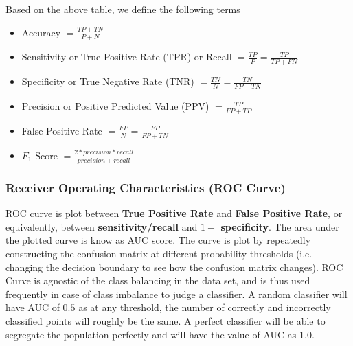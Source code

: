 \documentclass[11pt, a4paper]{article}
\begin{document}
    Based on the above table, we define the following terms
    \begin{itemize}
        \item Accuracy $= \frac{TP + TN}{P+N}$
        \item Sensitivity or True Positive Rate (TPR) or Recall $= \frac{TP}{P} = \frac{TP}{TP+FN}$
        \item Specificity or True Negative Rate (TNR) $= \frac{TN}{N} = \frac{TN}{FP+TN}$
        \item Precision or Positive Predicted Value (PPV) $= \frac{TP}{FP+TP}$
        \item False Positive Rate $= \frac{FP}{N} = \frac{FP}{FP+TN}$
        \item $F_{1}$ Score $= \frac{2 * precision * recall}{precision + recall}$
    \end{itemize}

    \subsubsection{Receiver Operating Characteristics (ROC Curve)}
    ROC curve is plot between \textbf{True Positive Rate} and \textbf{False Positive Rate}, or equivalently, between \textbf{sensitivity/recall} and \textbf{$1 - $ specificity}. The area under the plotted curve is know as AUC score. \newline
    The curve is plot by repeatedly constructing the confusion matrix at different probability thresholds (i.e. changing the decision boundary to see how the confusion matrix changes).\newline
    ROC Curve is agnostic of the class balancing in the data set, and is thus used frequently in case of class imbalance to judge a classifier. A random classifier will have AUC of $0.5$ as at any threshold, the number of correctly and incorrectly classified points will roughly be the same. A perfect classifier will be able to segregate the population perfectly and will have the value of AUC as $1.0$.
\end{document}
